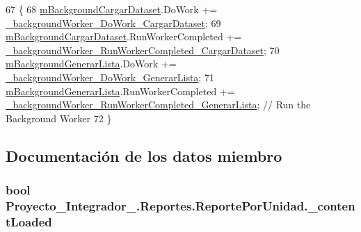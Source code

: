 \begin{DoxyCode}
67         \{
68             \hyperlink{class_proyecto___integrador__3_1_1_reportes_1_1_reporte_por_unidad_af7637868838da0f9e0f02b266fde6c59}{mBackgroundCargarDataset}.DoWork += 
      \hyperlink{class_proyecto___integrador__3_1_1_reportes_1_1_reporte_por_unidad_aa84fc5563333c7e790cdfce10661cbfa}{\_backgroundWorker\_DoWork\_CargarDataset};
69             \hyperlink{class_proyecto___integrador__3_1_1_reportes_1_1_reporte_por_unidad_af7637868838da0f9e0f02b266fde6c59}{mBackgroundCargarDataset}.RunWorkerCompleted += 
      \hyperlink{class_proyecto___integrador__3_1_1_reportes_1_1_reporte_por_unidad_a2d4b49248bce9187c40bc24a804b7fc7}{\_backgroundWorker\_RunWorkerCompleted\_CargarDataset};
70             \hyperlink{class_proyecto___integrador__3_1_1_reportes_1_1_reporte_por_unidad_a0df7b6ad6ce14f438848f0651d525261}{mBackgroundGenerarLista}.DoWork += 
      \hyperlink{class_proyecto___integrador__3_1_1_reportes_1_1_reporte_por_unidad_ae3378ea4446e84616184350803cdd093}{\_backgroundWorker\_DoWork\_GenerarLista};
71             \hyperlink{class_proyecto___integrador__3_1_1_reportes_1_1_reporte_por_unidad_a0df7b6ad6ce14f438848f0651d525261}{mBackgroundGenerarLista}.RunWorkerCompleted += 
      \hyperlink{class_proyecto___integrador__3_1_1_reportes_1_1_reporte_por_unidad_a0819f9c0e0427598f8281fc063c9bca8}{\_backgroundWorker\_RunWorkerCompleted\_GenerarLista}; \textcolor{comment}{// Run
       the Background Worker}
72         \}
\end{DoxyCode}


\subsection{Documentación de los datos miembro}
\hypertarget{class_proyecto___integrador__3_1_1_reportes_1_1_reporte_por_unidad_afd92a2e129c768f1cf763c22165393d6}{
\subsubsection[{\-\_\-content\-Loaded}]{\setlength{\rightskip}{0pt plus 5cm}bool Proyecto\-\_\-\-Integrador\-\_.\-Reportes.\-Reporte\-Por\-Unidad.\-\_\-content\-Loaded\hspace{0.3cm}{\ttfamily [private]}}}\label{class_proyecto___integrador__3_1_1_reportes_1_1_reporte_por_unidad_afd92a2e129c768f1cf763c22165393d6}


